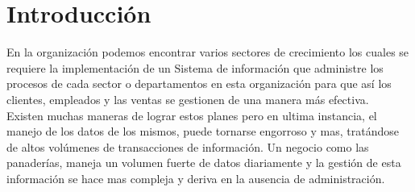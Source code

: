 \chapter*{Introducci\'on}
En la organizaci\'on podemos encontrar varios sectores de crecimiento los cuales se requiere la implementaci\'on de un Sistema de informaci\'on que administre los procesos de cada sector o departamentos en esta organizaci\'on para que as\'i los clientes, empleados y las ventas se gestionen de una manera m\'as efectiva.%
\\%
Existen muchas maneras de lograr estos planes pero en ultima instancia, el manejo de los datos de los mismos, puede tornarse engorroso y mas, trat\'andose de altos vol\'umenes de transacciones de informaci\'on. Un negocio como las panader\'ias, maneja un volumen fuerte de datos diariamente y la gesti\'on de esta informaci\'on se hace mas compleja y deriva en la ausencia de administraci\'on.%
\\%
\\%